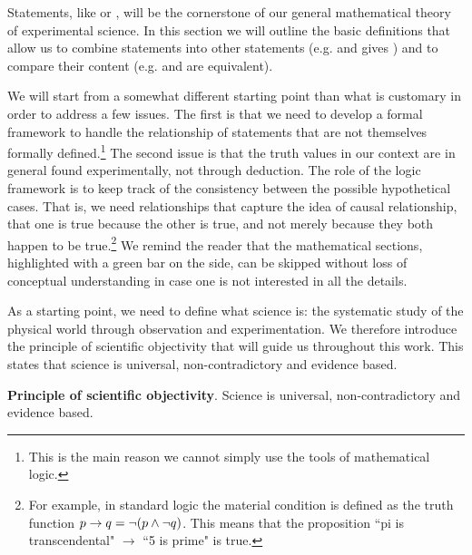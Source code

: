 \documentclass[11pt,letterpaper,fleqn]{memoir} %
\begin{document}
Statements, like  or , will be the cornerstone of our general mathematical theory of experimental science. In this section we will outline the basic definitions that allow us to combine statements into other statements (e.g.  and  gives ) and to compare their content (e.g.  and  are equivalent).

We will start from a somewhat different starting point than what is customary in order to address a few issues. The first is that we need to develop a formal framework to handle the relationship of statements that are not themselves formally defined.\footnote{This is the main reason we cannot simply use the tools of mathematical logic.} The second issue is that the truth values in our context are in general found experimentally, not through deduction. The role of the logic framework is to keep track of the consistency between the possible hypothetical cases. That is, we need relationships that capture the idea of causal relationship, that one is true because the other is true, and not merely because they both happen to be true.\footnote{For example, in standard logic the material condition is defined as the truth function $p \to q = \neg( p \wedge \neg q)$. This means that the proposition ``pi is transcendental" $\to$ ``5 is prime" is true.} We remind the reader that the mathematical sections, highlighted with a green bar on the side, can be skipped without loss of conceptual understanding in case one is not interested in all the details. 

As a starting point, we need to define what science is: the systematic study of the physical world through observation and experimentation. We therefore introduce the principle of scientific objectivity that will guide us throughout this work. This states that science is universal, non-contradictory and evidence based.

\begin{mathSection}
	\textbf{Principle of scientific objectivity}.
		Science is universal, non-contradictory and evidence based.
\end{mathSection}
\end{document}
